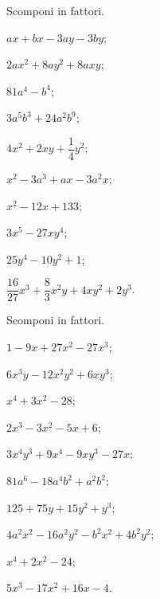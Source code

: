 \begin{esercizio}
 Scomponi in fattori.
 \begin{multicols}{2}
 \begin{enumeratea}
  \item $ax + bx - 3ay - 3by $;
\item $2ax^{2} + 8ay^{2} + 8axy$;
\item $81a^{4} - b^{4}$;
\item $3a^{5}b^{3} + 24a^{2}b^{9}$;
\item $4x^{2} + 2xy +\dfrac{1}{4}y^{2}$;
\item $x^{2} - 3a^{3} + ax - 3a^{2}x $;
\item $x^{2}-12x+133$;
\item $3x^{5} - 27xy^{4}$;
\item $25y^{4} - 10y^{2}+1$;
\item $\dfrac{16}{27}x^{3}+\dfrac{8}{3}x^{2}y+4xy^{2}+2y^{3}$.
 \end{enumeratea}
 \end{multicols}
\end{esercizio}

\begin{esercizio}
 Scomponi in fattori.
 \begin{multicols}{2}
 \begin{enumeratea}
  \item $1 - 9x + 27x^{2} - 27x^{3}$;
\item $6x^{3}y-12x^{2}y^{2}+6xy^{3}$;
\item $x^{4} + 3x^{2} - 28 $;
\item $2x^{3} - 3x^{2} - 5x + 6$;
\item $3x^{4}y^{3} + 9x^{4} - 9xy^{3} - 27x$;
\item $81a^{6} - 18a^{4}b^{2} + a^{2}b^{2}$;
\item $125 + 75y + 15y^{2} + y^{3}$;
\item $4a^{2}x^{2} - 16a^{2}y^{2} - b^{2}x^{2} + 4b^{2}y^{2}$;
\item $x^{4} + 2x^{2} - 24$;
\item $5x^{3} - 17x^{2} + 16x - 4$.
 \end{enumeratea}
 \end{multicols}
\end{esercizio}

